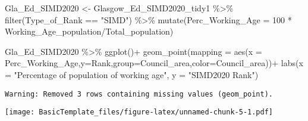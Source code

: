 \documentclass[
]{article}
\newenvironment{Shaded}{\begin{snugshade}}{\end{snugshade}}
\newcommand{\AttributeTok}[1]{\textcolor[rgb]{0.77,0.63,0.00}{#1}}
\newcommand{\DecValTok}[1]{\textcolor[rgb]{0.00,0.00,0.81}{#1}}
\newcommand{\FunctionTok}[1]{\textcolor[rgb]{0.00,0.00,0.00}{#1}}
\newcommand{\NormalTok}[1]{#1}
\newcommand{\OtherTok}[1]{\textcolor[rgb]{0.56,0.35,0.01}{#1}}
\newcommand{\SpecialCharTok}[1]{\textcolor[rgb]{0.00,0.00,0.00}{#1}}
\newcommand{\StringTok}[1]{\textcolor[rgb]{0.31,0.60,0.02}{#1}}
\begin{document}
\begin{Shaded}
\begin{Highlighting}[]
\NormalTok{Gla\_Ed\_SIMD2020 }\OtherTok{\textless{}{-}}\NormalTok{ Glasgow\_Ed\_SIMD2020\_tidy1 }\SpecialCharTok{\%\textgreater{}\%} 
  \FunctionTok{filter}\NormalTok{(Type\_of\_Rank }\SpecialCharTok{==} \StringTok{"SIMD"}\NormalTok{) }\SpecialCharTok{\%\textgreater{}\%} 
  \FunctionTok{mutate}\NormalTok{(}\AttributeTok{Perc\_Working\_Age =} \DecValTok{100} \SpecialCharTok{*}\NormalTok{ Working\_Age\_population}\SpecialCharTok{/}\NormalTok{Total\_population)}
\end{Highlighting}
\end{Shaded}

\begin{Shaded}
\begin{Highlighting}[]
\NormalTok{Gla\_Ed\_SIMD2020 }\SpecialCharTok{\%\textgreater{}\%} 
  \FunctionTok{ggplot}\NormalTok{()}\SpecialCharTok{+}
  \FunctionTok{geom\_point}\NormalTok{(}\AttributeTok{mapping =} \FunctionTok{aes}\NormalTok{(}\AttributeTok{x =}\NormalTok{ Perc\_Working\_Age,}\AttributeTok{y=}\NormalTok{Rank,}\AttributeTok{group=}\NormalTok{Council\_area,}\AttributeTok{color=}\NormalTok{Council\_area))}\SpecialCharTok{+}
  \FunctionTok{labs}\NormalTok{(}\AttributeTok{x =} \StringTok{"Percentage of population of working age"}\NormalTok{, }\AttributeTok{y =} \StringTok{"SIMD2020 Rank"}\NormalTok{)}
\end{Highlighting}
\end{Shaded}

\begin{verbatim}
Warning: Removed 3 rows containing missing values (geom_point).
\end{verbatim}

\texttt{[image: BasicTemplate\_files/figure-latex/unnamed-chunk-5-1.pdf]}
\end{document}
